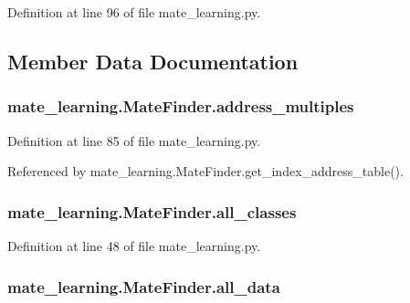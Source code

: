 Definition at line 96 of file mate\+\_\+learning.\+py.



\subsection{Member Data Documentation}
\hypertarget{classmate__learning_1_1_mate_finder_ac42fe95eaa044c91077b75953128fc23}{
\subsubsection[{address\+\_\+multiples}]{\setlength{\rightskip}{0pt plus 5cm}mate\+\_\+learning.\+Mate\+Finder.\+address\+\_\+multiples}}\label{classmate__learning_1_1_mate_finder_ac42fe95eaa044c91077b75953128fc23}


Definition at line 85 of file mate\+\_\+learning.\+py.



Referenced by mate\+\_\+learning.\+Mate\+Finder.\+get\+\_\+index\+\_\+address\+\_\+table().

\hypertarget{classmate__learning_1_1_mate_finder_a964c20920e14dfc4d5091142d429fe06}{
\subsubsection[{all\+\_\+classes}]{\setlength{\rightskip}{0pt plus 5cm}mate\+\_\+learning.\+Mate\+Finder.\+all\+\_\+classes}}\label{classmate__learning_1_1_mate_finder_a964c20920e14dfc4d5091142d429fe06}


Definition at line 48 of file mate\+\_\+learning.\+py.

\hypertarget{classmate__learning_1_1_mate_finder_a7347330ac72c85afd3f9fca87640d294}{
\subsubsection[{all\+\_\+data}]{\setlength{\rightskip}{0pt plus 5cm}mate\+\_\+learning.\+Mate\+Finder.\+all\+\_\+data}}\label{classmate__learning_1_1_mate_finder_a7347330ac72c85afd3f9fca87640d294}


